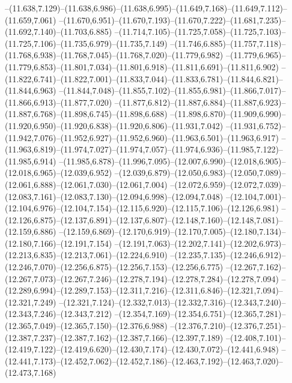   --(11.638,7.129)--(11.638,6.986)--(11.638,6.995)--(11.649,7.168)--(11.649,7.112)--(11.659,7.061)%
  --(11.670,6.951)--(11.670,7.193)--(11.670,7.222)--(11.681,7.235)--(11.692,7.140)--(11.703,6.885)%
  --(11.714,7.105)--(11.725,7.058)--(11.725,7.103)--(11.725,7.106)--(11.735,6.979)--(11.735,7.149)%
  --(11.746,6.885)--(11.757,7.118)--(11.768,6.938)--(11.768,7.045)--(11.768,7.020)--(11.779,6.982)%
  --(11.779,6.965)--(11.779,6.853)--(11.801,7.034)--(11.801,6.918)--(11.811,6.691)--(11.811,6.902)%
  --(11.822,6.741)--(11.822,7.001)--(11.833,7.044)--(11.833,6.781)--(11.844,6.821)--(11.844,6.963)%
  --(11.844,7.048)--(11.855,7.102)--(11.855,6.981)--(11.866,7.017)--(11.866,6.913)--(11.877,7.020)%
  --(11.877,6.812)--(11.887,6.884)--(11.887,6.923)--(11.887,6.768)--(11.898,6.745)--(11.898,6.688)%
  --(11.898,6.870)--(11.909,6.990)--(11.920,6.950)--(11.920,6.838)--(11.920,6.806)--(11.931,7.042)%
  --(11.931,6.752)--(11.942,7.076)--(11.952,6.927)--(11.952,6.960)--(11.963,6.501)--(11.963,6.917)%
  --(11.963,6.819)--(11.974,7.027)--(11.974,7.057)--(11.974,6.936)--(11.985,7.122)--(11.985,6.914)%
  --(11.985,6.878)--(11.996,7.095)--(12.007,6.990)--(12.018,6.905)--(12.018,6.965)--(12.039,6.952)%
  --(12.039,6.879)--(12.050,6.983)--(12.050,7.089)--(12.061,6.888)--(12.061,7.030)--(12.061,7.004)%
  --(12.072,6.959)--(12.072,7.039)--(12.083,7.161)--(12.083,7.130)--(12.094,6.998)--(12.094,7.048)%
  --(12.104,7.001)--(12.104,6.976)--(12.104,7.154)--(12.115,6.920)--(12.115,7.106)--(12.126,6.981)%
  --(12.126,6.875)--(12.137,6.891)--(12.137,6.807)--(12.148,7.160)--(12.148,7.081)--(12.159,6.886)%
  --(12.159,6.869)--(12.170,6.919)--(12.170,7.005)--(12.180,7.134)--(12.180,7.166)--(12.191,7.154)%
  --(12.191,7.063)--(12.202,7.141)--(12.202,6.973)--(12.213,6.835)--(12.213,7.061)--(12.224,6.910)%
  --(12.235,7.135)--(12.246,6.912)--(12.246,7.070)--(12.256,6.875)--(12.256,7.153)--(12.256,6.775)%
  --(12.267,7.162)--(12.267,7.073)--(12.267,7.246)--(12.278,7.194)--(12.278,7.284)--(12.278,7.094)%
  --(12.289,6.994)--(12.289,7.153)--(12.311,7.216)--(12.311,6.846)--(12.321,7.094)--(12.321,7.249)%
  --(12.321,7.124)--(12.332,7.013)--(12.332,7.316)--(12.343,7.240)--(12.343,7.246)--(12.343,7.212)%
  --(12.354,7.169)--(12.354,6.751)--(12.365,7.281)--(12.365,7.049)--(12.365,7.150)--(12.376,6.988)%
  --(12.376,7.210)--(12.376,7.251)--(12.387,7.237)--(12.387,7.162)--(12.387,7.166)--(12.397,7.189)%
  --(12.408,7.101)--(12.419,7.122)--(12.419,6.620)--(12.430,7.174)--(12.430,7.072)--(12.441,6.948)%
  --(12.441,7.173)--(12.452,7.062)--(12.452,7.186)--(12.463,7.192)--(12.463,7.020)--(12.473,7.168)%
